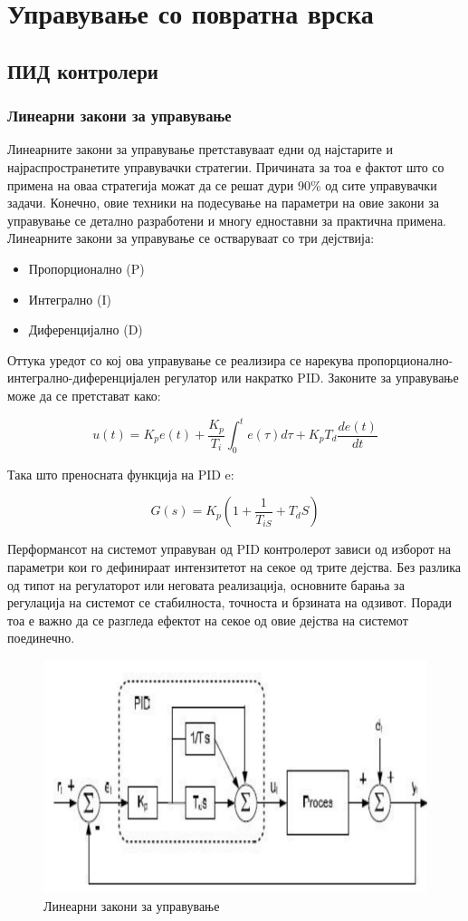 \documentclass[12pt]{article}
\begin{document}
\section{Управување со повратна врска}
  \subsection{ПИД контролери}
    \subsubsection{Линеарни закони за управување}
      Линеарните закони за управување претставуваат едни од најстарите и најраспространетите управувачки стратегии. Причината за тоа е фактот што со примена на оваа стратегија можат да се решат дури 90\% од сите управувачки задачи. Конечно, овие техники на подесување на параметри на овие закони за управување се детално разработени и многу едноставни за практична примена.\\
      Линеарните закони за управување се остваруваат со три дејствија:
			\begin{itemize}
				\item Пропорционално (P)
				\item Интегрално (I)
				\item Диференцијално (D)
				\end{itemize}

			Оттука уредот со кој ова управување се реализира се нарекува пропорционално-интегрално-диференцијален регулатор или накратко PID. Законите за управување може да се претстават како:

      $$ u(t) = K_{p}e(t)+\frac{K_{p}}{T_{i}}\int_{0}^{t}{e(\tau)d\tau} + K_{p}T_{d}\frac{de(t)}{dt} $$

      Така што преносната функција на PID e:

			$$ G(s) = K_{p}(1+\frac{1}{T_{iS}}+T_{d}S) $$

			Перформансот на системот управуван од PID контролерот зависи од изборот на параметри кои го дефинираат интензитетот на секое од трите дејства. Без разлика од типот на регулаторот или неговата реализација, основните барања за регулација на системот се стабилноста, точноста и брзината на одзивот. Поради тоа е важно да се разгледа ефектот на секое од овие дејства на системот поединечно.

			\begin{figure}[H]
				\includegraphics[width=0.5\linewidth]{./images/li_za_up.png}
				\centering
				\caption{Линеарни закони за управување}
				\label{fig:li_za_up.png}
				\end{figure}
\end{document}
